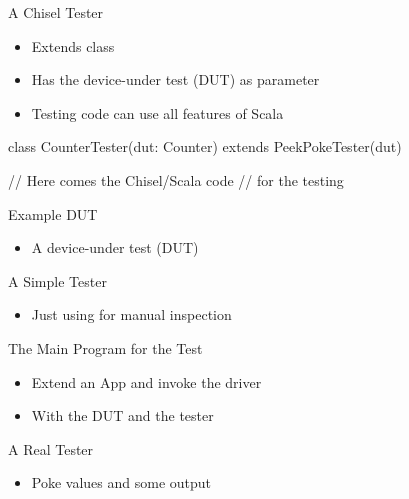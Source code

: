 \begin{frame}[fragile]{A Chisel Tester}
\begin{itemize}
\item Extends class 
\item Has the device-under test (DUT) as parameter
\item Testing code can use all features of Scala
\end{itemize}
\begin{chisel}
class CounterTester(dut: Counter) extends PeekPokeTester(dut) {

  // Here comes the Chisel/Scala code
  // for the testing
}
\end{chisel}
\end{frame}

\begin{frame}[fragile]{Example DUT}
\begin{itemize}
\item A device-under test (DUT)
\end{itemize}
\end{frame}

\begin{frame}[fragile]{A Simple Tester}
\begin{itemize}
\item Just using  for manual inspection
\end{itemize}
\end{frame}


\begin{frame}[fragile]{The Main Program for the Test}
\begin{itemize}
\item Extend an App and invoke the  driver
\item With the DUT and the tester
\end{itemize}
\end{frame}

\begin{frame}[fragile]{A Real Tester}
\begin{itemize}
\item Poke values and  some output
\end{itemize}
\end{frame}


